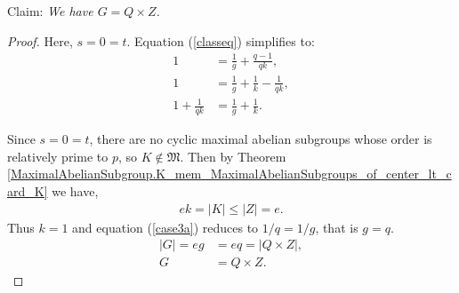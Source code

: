 \begin{theorem}
\label{case_III}
\leanok
Claim: \textit{We have $G = Q \times Z$.}
\end{theorem}
\begin{proof} Here, $s = 0 = t$. Equation (\ref{classeq}) simplifies to:
\begin{align}\label{case3a} 1 &= \frac{1}{g} + \frac{q-1}{qk}, \nonumber
\\ 1 &= \frac{1}{g} + \frac{1}{k} - \frac{1}{qk}, \nonumber
\\ 1 + \frac{1}{qk} &= \frac{1}{g} + \frac{1}{k}.
\end{align}

Since $s = 0 = t$, there are no cyclic maximal abelian subgroups whose order is relatively prime to $p$, so $K \not \in \mathfrak{M}$. Then by Theorem \ref{MaximalAbelianSubgroup.K_mem_MaximalAbelianSubgroups_of_center_lt_card_K} we have,
\begin{align*} ek = |K| \leq |Z| = e.
\end{align*} 
Thus $k = 1$ and equation (\ref{case3a}) reduces to $1/q = 1/g$, that is $g=q$.
\begin{align*} |G| =  eg &= eq = |Q \times Z|,
\\ G &= Q \times Z.
\end{align*}
\qedhere
\end{proof}



